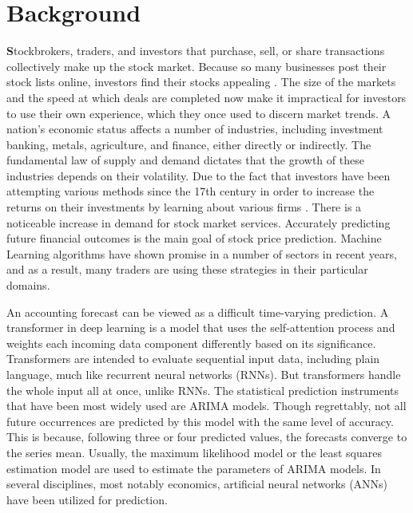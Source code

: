 \section{Background}
\label{sec:into_back}


\textbf
Stockbrokers, traders, and investors that purchase, sell, or share transactions 
collectively make up the stock market. Because so many businesses post their stock lists 
online, investors find their stocks appealing \citep{bhattacharjee2019stock}. The size of the 
markets and the speed at which deals are completed now make it impractical for investors to use 
their own experience, which they once used to discern market trends. A nation's economic status 
affects a number of industries, including investment banking, metals, agriculture, and finance, 
either directly or indirectly. The fundamental law of supply and demand dictates that the 
growth of these industries depends on their volatility. Due to the fact that investors have 
been attempting various methods since the 17th century in order to increase the returns on their 
investments by learning about various firms \citep{mehta2021stock}. There is a noticeable 
increase in demand for stock market services. Accurately predicting future financial outcomes is the 
main goal of stock price prediction. Machine Learning algorithms have shown promise in a number 
of sectors in recent years, and as a result, many traders are using these strategies in their 
particular domains. 

An accounting forecast can be viewed as a difficult time-varying prediction. A transformer in 
deep learning is a model that uses the self-attention process and weights each incoming data 
component differently based on its significance. Transformers are intended to evaluate 
sequential input data, including plain language, much like recurrent neural networks (RNNs). 
But transformers handle the whole input all at once, unlike RNNs. The statistical prediction 
instruments that have been most widely used are ARIMA models. Though regrettably, not all 
future occurrences are predicted by this model with the same level of accuracy. This is 
because, following three or four predicted values, the forecasts converge to the series mean. 
Usually, the maximum likelihood model or the least squares estimation model are used to 
estimate the parameters of ARIMA models. In several disciplines, most notably economics, 
artificial neural networks (ANNs) have been utilized for prediction. 

